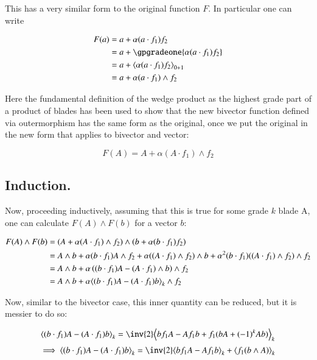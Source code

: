 This has a very similar form to the original function $F$.  In particular 
one can write 

\begin{align*}
F(a) 
&= a + \alpha(a \cdot f_1) f_2 \\
&= a + \gpgradeone{\alpha(a \cdot f_1) f_2} \\
&= a + \gpgrade{\alpha(a \cdot f_1) f_2}{0+1} \\
&= a + \alpha(a \cdot f_1) \wedge f_2 \\
\end{align*}

Here the fundamental definition of the wedge product as the 
highest grade part of a product of blades has been used to show that the new
bivector function defined via outermorphism has the same form as the original, once we put the original in the new form that applies to bivector and vector:

\begin{equation}
F(A) = A + \alpha(A \cdot f_1) \wedge f_2 
\end{equation}

\subsection{Induction. }

Now, proceeding inductively, assuming that this is true for some grade $k$ blade A, one can calculate $F(A) \wedge F(b)$ for a vector $b$:

\begin{align*}
F(A) \wedge F(b)
&= (A + \alpha(A \cdot f_1) \wedge f_2) \wedge (b + \alpha(b \cdot f_1) f_2 ) \\
&= A \wedge b 
+ \alpha( b \cdot f_1 ) A \wedge f_2 
+ \alpha (( A \cdot f_1) \wedge f_2) \wedge b
+ \alpha^2 (b \cdot f_1) ((A \cdot f_1) \wedge f_2) \wedge f_2 \\
&= A \wedge b + \alpha \left( ( b \cdot f_1 ) A - ( A \cdot f_1) \wedge b \right) \wedge f_2 \\
&= A \wedge b + \alpha {\left\langle{{ ( b \cdot f_1 ) A - ( A \cdot f_1) b}}\right\rangle}_{k} \wedge f_2 \\
\end{align*}

Now, similar to the bivector case, this inner quantity can be reduced, but it is messier to do so:

\begin{align*}
\gpgrade{ ( b \cdot f_1 ) A - ( A \cdot f_1) b}{k}
&= \inv{2} \gpgrade{ b f_1 A - A f_1 b + f_1 (b A + (-1)^{k} A b) }{k} \\
\end{align*}
\begin{equation} \label{eqn:outermorphism_det:r1}
\implies
\gpgrade{ ( b \cdot f_1 ) A - ( A \cdot f_1) b}{k} = \inv{2} \gpgrade{ b f_1 A - A f_1 b}{k} + \gpgrade{ f_1 (b \wedge A) }{k}
\end{equation}


